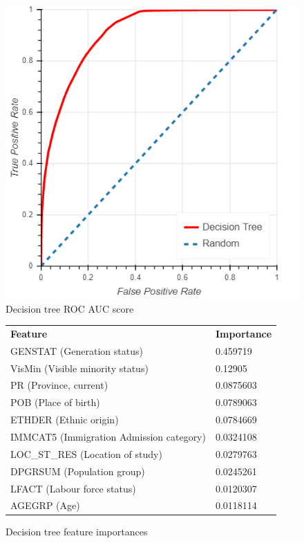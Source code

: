 \documentclass[10pt, conference, compsocconf]{IEEEtran}
\begin{document}
\begin{figure}
  \includegraphics[scale=0.45]{decision_tree_roc}
  \centering
  \caption{Decision tree ROC AUC score}
  \label{fig:decision_tree_roc}
\end{figure}

\begin{figure}
  \begin{tabular}{ll}
    \textbf{Feature}                          & \textbf{Importance} \\
    GENSTAT (Generation status)               & 0.459719 \\
    VisMin (Visible minority status)          & 0.12905 \\
    PR (Province, current)                    & 0.0875603 \\
    POB (Place of birth)                      & 0.0789063 \\
    ETHDER (Ethnic origin)                    & 0.0784669 \\
    IMMCAT5 (Immigration Admission category)  & 0.0324108 \\
    LOC\_ST\_RES (Location of study)          & 0.0279763 \\
    DPGRSUM (Population group)                & 0.0245261 \\
    LFACT (Labour force status)               & 0.0120307 \\
    AGEGRP (Age)                              & 0.0118114 \\   
  \end{tabular}
  \caption{Decision tree feature importances}
  \label{fig:decision_tree_importances}
\end{figure}
\end{document}
